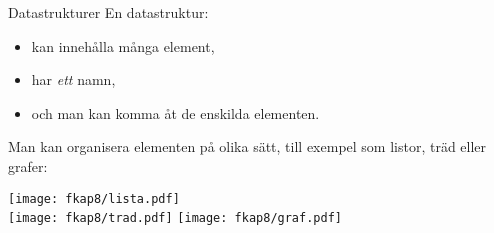 \documentclass{lecturenotes}
\begin{document}
\begin{Slide}{Datastrukturer}
En datastruktur:

\begin{itemize}
\item kan innehålla många element,
\item har \emph{ett} namn,
\item och man kan komma åt de enskilda elementen.
\end{itemize}

Man kan organisera elementen på olika sätt, till exempel som listor, träd eller grafer:

\begin{center}
\texttt{[image: fkap8/lista.pdf]}\\
\vspace{5mm}
\texttt{[image: fkap8/trad.pdf]}
\hspace{5mm}
\texttt{[image: fkap8/graf.pdf]}
\end{center}
\end{Slide} 
%
%
%
\end{document}
